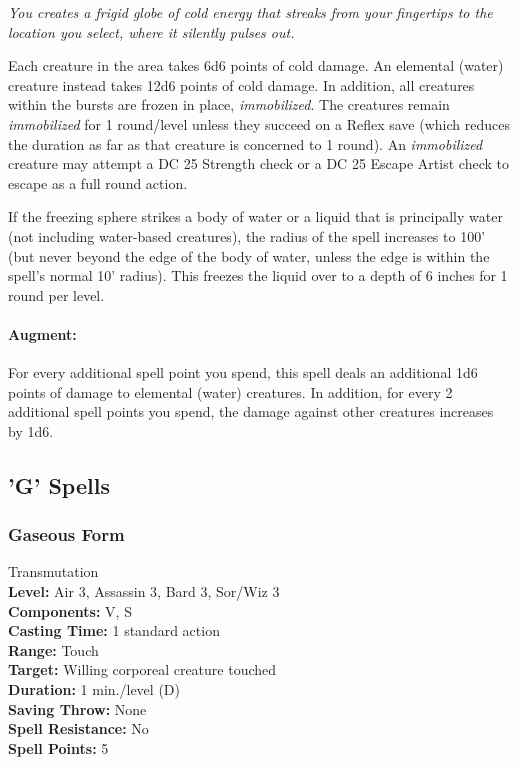 \emph{You creates a frigid globe of cold energy that streaks from your fingertips to the location you select, where it silently pulses out.} 

Each creature in the area takes 6d6 points of cold damage. 
An elemental (water) creature instead takes 12d6 points of cold damage.
In addition, all creatures within the bursts are frozen in place, \emph{immobilized}.
The creatures remain \emph{immobilized} for 1 round/level unless they succeed on a Reflex save (which reduces the duration as far as that creature is concerned to 1 round).
An \emph{immobilized} creature may attempt a DC 25 Strength check or a DC 25 Escape Artist check to escape as a full round action.

If the freezing sphere strikes a body of water or a liquid that is principally water (not including water-based creatures), the radius of the spell increases to 100' (but never beyond the edge of the body of water, unless the edge is within the spell's normal 10' radius).
This freezes the liquid over to a depth of 6 inches for 1 round per level.

\paragraph{Augment:} For every additional spell point you spend, this spell deals an additional 1d6 points of damage to elemental (water) creatures.
In addition, for every 2 additional spell points you spend, the damage against other creatures increases by 1d6.
\subsection{'G' Spells}
\subsubsection{Gaseous Form}
\label{Spell:GaseousForm}
Transmutation
\\ \textbf{Level:} Air 3, Assassin 3, Bard 3, Sor/Wiz 3
\\ \textbf{Components:} V, S
\\ \textbf{Casting Time:} 1 standard action
\\ \textbf{Range:} Touch
\\ \textbf{Target:} Willing corporeal creature touched
\\ \textbf{Duration:} 1 min./level (D)
\\ \textbf{Saving Throw:} None
\\ \textbf{Spell Resistance:} No
\\ \textbf{Spell Points:} 5

